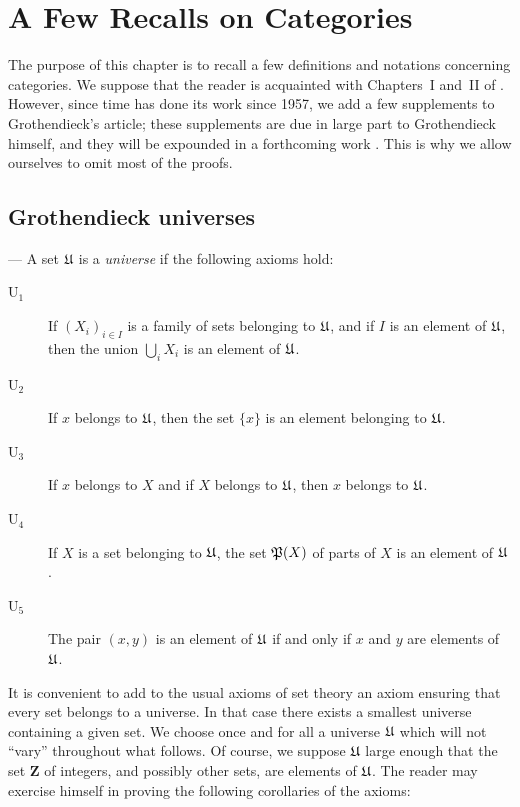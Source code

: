 
\chapter{A Few Recalls on Categories}

The purpose of this chapter is to recall a few definitions and notations
concerning categories. We suppose that the reader is acquainted with
Chapters~I and~II of \cite{grothendieck-1}. However, since time has done its work since 1957,
we add a few supplements to Grothendieck's article; these supplements are due
in large part to Grothendieck himself, and they will be expounded in a
forthcoming work \cite{chevalley-grothendieck}. This is why we allow ourselves to omit most of the
proofs.

\section{Grothendieck universes}
--- A set $\mathfrak{U}$ is a \emph{universe} if the following axioms hold:

\begin{description}
\item[$\mathrm{U}_1$] If $(X_i)_{i\in I}$ is a family of sets belonging to
$\mathfrak{U}$, and if $I$ is an element of $\mathfrak{U}$, then the union $\bigcup_i X_i$
is an element of $\mathfrak{U}$.

\item[$\mathrm{U}_2$] If $x$ belongs to $\mathfrak{U}$, then the set $\{x\}$ is an
element belonging to $\mathfrak{U}$.

\item[$\mathrm{U}_3$] If $x$ belongs to $X$ and if $X$ belongs to $\mathfrak{U}$,
then $x$ belongs to $\mathfrak{U}$.

\item[$\mathrm{U}_4$] If $X$ is a set belonging to $\mathfrak{U}$, the set
$\mathfrak{P}(X)$ of parts of $X$ is an element of $\mathfrak{U}$.

\item[$\mathrm{U}_5$] The pair $(x,y)$ is an element of $\mathfrak{U}$ if and only
if $x$ and $y$ are elements of $\mathfrak{U}$.
\end{description}

It is convenient to add to the usual axioms of set theory an axiom ensuring
that every set belongs to a universe. In that case there exists a smallest
universe containing a given set. We choose once and for all a universe $\mathfrak{U}$
which will not ``vary'' throughout what follows. Of course, we suppose $\mathfrak{U}$
large enough that the set $\mathbf{Z}$ of integers, and possibly other sets,
are elements of $\mathfrak{U}$. The reader may exercise himself in proving the
following corollaries of the axioms:

